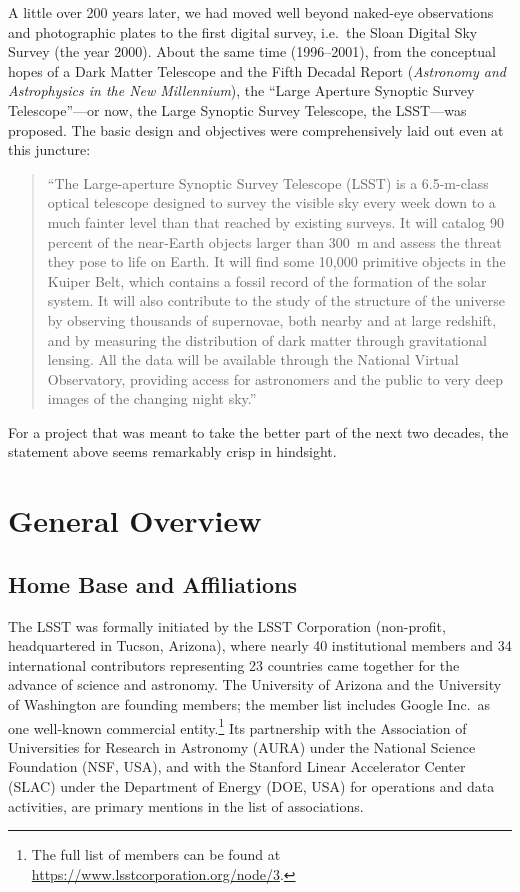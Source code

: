 \documentclass[12pt,a4paper]{article}
\begin{document}
A little over 200 years later, we had moved well beyond naked-eye observations
and photographic plates to the first digital survey, i.e.\ the Sloan Digital
Sky Survey (the year 2000). About the same time (1996--2001), from the
conceptual hopes of a Dark Matter Telescope and the Fifth Decadal Report
(\textit{Astronomy and Astrophysics in the New Millennium}), the ``Large
Aperture Synoptic Survey Telescope''---or now, the Large Synoptic Survey
Telescope, the LSST---was proposed. The basic design and objectives were
comprehensively laid out even at this juncture:

\begin{quote}
  ``The Large-aperture Synoptic Survey Telescope (LSST) is a 6.5-m-class
  optical telescope designed to survey the visible sky every week down to a
  much fainter level than that reached by existing surveys. It will catalog
  90 percent of the near-Earth objects larger than 300~m and assess the threat
  they pose to life on Earth. It will find some 10,000 primitive objects in the
  Kuiper Belt, which contains a fossil record of the formation of the solar
  system. It will also contribute to the study of the structure of the universe
  by observing thousands of supernovae, both nearby and at large redshift, and
  by measuring the distribution of dark matter through gravitational lensing.
  All the data will be available through the National Virtual Observatory,
  providing access for astronomers and the public to very deep images of the
  changing night sky.''
\end{quote}

For a project that was meant to take the better part of the next two decades,
the statement above seems remarkably crisp in hindsight.

\section{General Overview}

\subsection{Home Base and Affiliations}

The LSST was formally initiated by the LSST Corporation (non-profit,
headquartered in Tucson, Arizona), where nearly 40 institutional members and
34 international contributors representing 23 countries came together for the
advance of science and astronomy. The University of Arizona and the University
of Washington are founding members; the member list includes Google Inc.\ as
one well-known commercial entity.\footnote{The full list of members can be
found at \url{https://www.lsstcorporation.org/node/3}.} Its partnership with
the Association of Universities for Research in Astronomy (AURA) under the
National Science Foundation (NSF, USA), and with the Stanford Linear
Accelerator Center (SLAC) under the Department of Energy (DOE, USA) for
operations and data activities, are primary mentions in the list of
associations.
\end{document}
